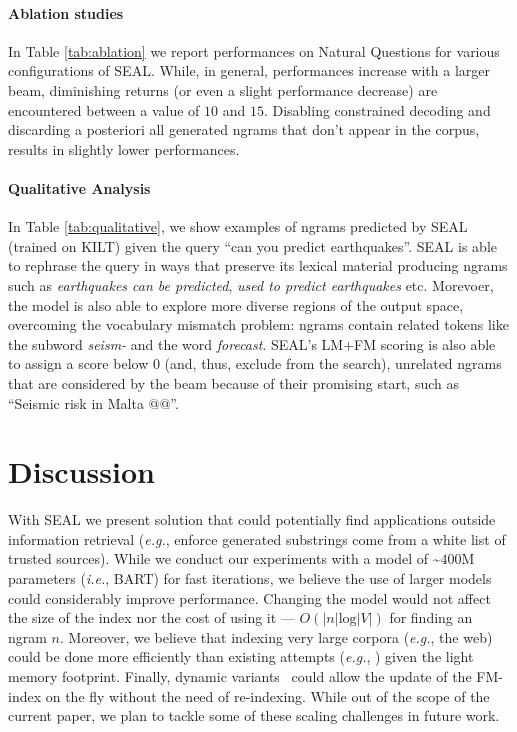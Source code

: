 \documentclass[11pt]{article}
\newcommand{\eg}{\textit{e.g.}}
\newcommand{\ie}{\textit{i.e.}}
\newcommand{\system}{\textsc{SEAL}}
\begin{document}
\paragraph{Ablation studies}
In Table \ref{tab:ablation} we report performances on Natural Questions for various configurations of \system{}.
While, in general, performances increase with a larger beam, diminishing returns (or even a slight performance decrease) are encountered between a value of $10$ and $15$. Disabling constrained decoding and discarding a posteriori all generated ngrams that don't appear in the corpus,
results in slightly lower performances. 

\paragraph{Qualitative Analysis}
In Table \ref{tab:qualitative}, we show examples of ngrams predicted by \system{} (trained on KILT) given the query ``can you predict earthquakes''. \system{} is able to rephrase
the query in ways that preserve its lexical material producing ngrams such as \textit{earthquakes can be predicted}, \textit{used to predict earthquakes} etc. Morevoer, the model is also able to explore more diverse regions of the output space, overcoming the vocabulary mismatch problem: ngrams contain related tokens like the subword \textit{seism-} and the word \textit{forecast}. \system{}'s LM+FM scoring is also able to assign a score below $0$ (and, thus, exclude from the search), unrelated ngrams that are considered by the beam because of their promising start, such as ``Seismic risk in Malta @@''. 

\section{Discussion}
With \system{} we present solution that could potentially find applications outside information retrieval (\eg, enforce generated substrings come from a white list of trusted sources).
While we conduct our experiments with a model of \textasciitilde$400$M parameters (\ie, BART) for fast iterations, we believe the use of larger models could considerably improve performance. Changing the model would not affect the size of the index nor the cost of using it --- $O(|n|\text{log}|V|)$ for finding an ngram $n$. 
Moreover, we believe that indexing very large corpora (\eg, the web) could be done more efficiently than existing attempts (\eg, \citet{piktus-etal-2021-web}) given the light memory footprint. Finally, dynamic variants~\citep{Gerlach2007DynamicFF,Salson2009a} could allow the update of the FM-index on the fly without the need of re-indexing. While out of the scope of the current paper, we plan to tackle some of these scaling challenges in future work.
\end{document}
